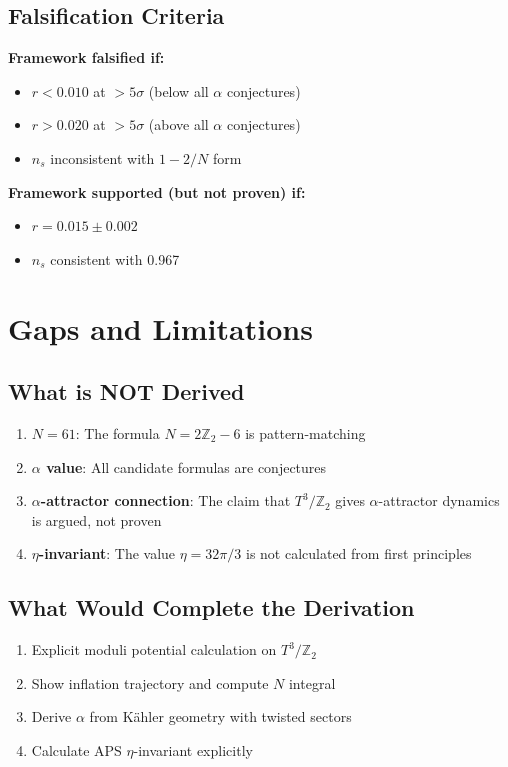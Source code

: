 \documentclass[12pt,a4paper]{article}
\begin{document}
\subsection{Falsification Criteria}

\textbf{Framework falsified if:}
\begin{itemize}
    \item $r < 0.010$ at $>5\sigma$ (below all $\alpha$ conjectures)
    \item $r > 0.020$ at $>5\sigma$ (above all $\alpha$ conjectures)
    \item $n_s$ inconsistent with $1 - 2/N$ form
\end{itemize}

\textbf{Framework supported (but not proven) if:}
\begin{itemize}
    \item $r = 0.015 \pm 0.002$
    \item $n_s$ consistent with 0.967
\end{itemize}

\section{Gaps and Limitations}

\subsection{What is NOT Derived}

\begin{enumerate}
    \item \textbf{$N = 61$}: The formula $N = 2\mathbb{Z}_2 - 6$ is pattern-matching
    \item \textbf{$\alpha$ value}: All candidate formulas are conjectures
    \item \textbf{$\alpha$-attractor connection}: The claim that $T^3/\mathbb{Z}_2$ gives $\alpha$-attractor dynamics is argued, not proven
    \item \textbf{$\eta$-invariant}: The value $\eta = 32\pi/3$ is not calculated from first principles
\end{enumerate}

\subsection{What Would Complete the Derivation}

\begin{enumerate}
    \item Explicit moduli potential calculation on $T^3/\mathbb{Z}_2$
    \item Show inflation trajectory and compute $N$ integral
    \item Derive $\alpha$ from K\"ahler geometry with twisted sectors
    \item Calculate APS $\eta$-invariant explicitly
\end{enumerate}
\end{document}
